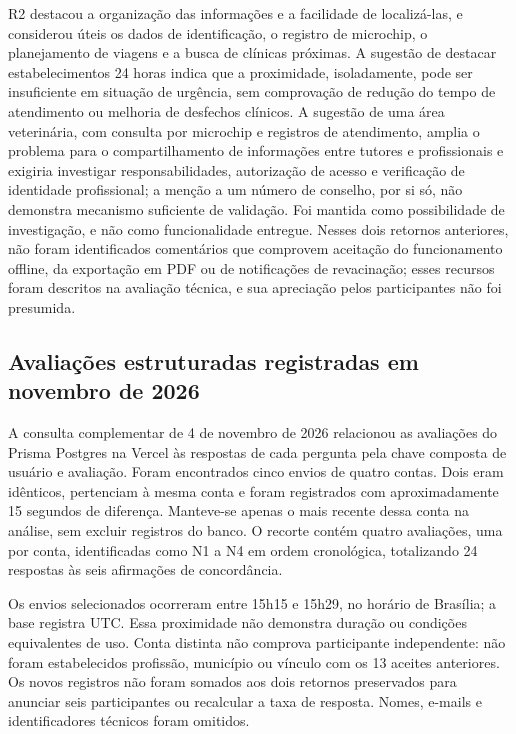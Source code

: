 \documentclass{UNESC}
\begin{document}
R2 destacou a organização das informações e a facilidade de localizá-las, e considerou úteis os dados de identificação, o registro de microchip, o planejamento de viagens e a busca de clínicas próximas. A sugestão de destacar estabelecimentos 24 horas indica que a proximidade, isoladamente, pode ser insuficiente em situação de urgência, sem comprovação de redução do tempo de atendimento ou melhoria de desfechos clínicos. A sugestão de uma área veterinária, com consulta por microchip e registros de atendimento, amplia o problema para o compartilhamento de informações entre tutores e profissionais e exigiria investigar responsabilidades, autorização de acesso e verificação de identidade profissional; a menção a um número de conselho, por si só, não demonstra mecanismo suficiente de validação. Foi mantida como possibilidade de investigação, e não como funcionalidade entregue. Nesses dois retornos anteriores, não foram identificados comentários que comprovem aceitação do funcionamento offline, da exportação em PDF ou de notificações de revacinação; esses recursos foram descritos na avaliação técnica, e sua apreciação pelos participantes não foi presumida.

\subsection{Avaliações estruturadas registradas em novembro de 2026}
\label{sec:feedbacks_novembro}

A consulta complementar de 4 de novembro de 2026 relacionou as avaliações do Prisma Postgres na Vercel às respostas de cada pergunta pela chave composta de usuário e avaliação. Foram encontrados cinco envios de quatro contas. Dois eram idênticos, pertenciam à mesma conta e foram registrados com aproximadamente 15 segundos de diferença. Manteve-se apenas o mais recente dessa conta na análise, sem excluir registros do banco. O recorte contém quatro avaliações, uma por conta, identificadas como N1 a N4 em ordem cronológica, totalizando 24 respostas às seis afirmações de concordância.

Os envios selecionados ocorreram entre 15h15 e 15h29, no horário de Brasília; a base registra UTC. Essa proximidade não demonstra duração ou condições equivalentes de uso. Conta distinta não comprova participante independente: não foram estabelecidos profissão, município ou vínculo com os 13 aceites anteriores. Os novos registros não foram somados aos dois retornos preservados para anunciar seis participantes ou recalcular a taxa de resposta. Nomes, e-mails e identificadores técnicos foram omitidos.
\end{document}
